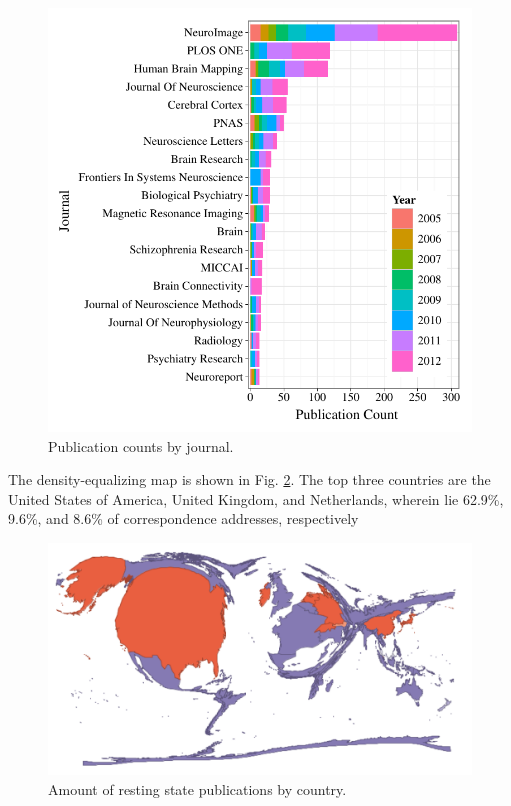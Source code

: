 \documentclass[5p]{elsarticle}
\begin{document}
\begin{figure}
  \begin{center}
    \includegraphics[width=\linewidth]{figures/journal_dist}%
    \caption{Publication counts by journal.
        \label{fig:journal_dist}
    }
  \end{center}
\end{figure}


The density-equalizing map is shown in Fig. \ref{fig:resting_state_map}. The top
three countries are the United States of America, United Kingdom, and
Netherlands, wherein lie 62.9\%, 9.6\%, and 8.6\% of correspondence addresses,
respectively

\begin{figure}
  \begin{center}
    \includegraphics[width=\linewidth]{figures/resting_state_map}%
    \caption{Amount of resting state publications by country.
        \label{fig:resting_state_map}
    }
  \end{center}
\end{figure}
\end{document}
